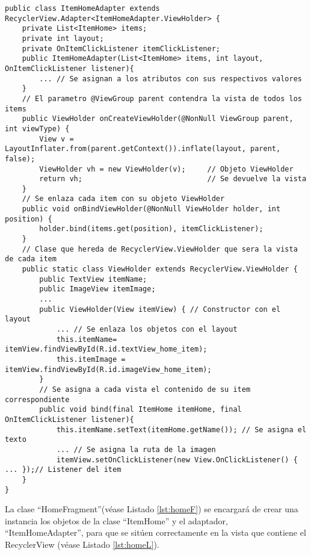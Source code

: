     


\bigskip

\begin{lstlisting}[caption={Fichero \texttt{ItemHomeAdapter.java}, clase que construye las vistas de los ítems.},  label={lst:adapterItem}]
public class ItemHomeAdapter extends RecyclerView.Adapter<ItemHomeAdapter.ViewHolder> {
    private List<ItemHome> items;
    private int layout;
    private OnItemClickListener itemClickListener;
    public ItemHomeAdapter(List<ItemHome> items, int layout, OnItemClickListener listener){
        ... // Se asignan a los atributos con sus respectivos valores
    }
    // El parametro @ViewGroup parent contendra la vista de todos los items
    public ViewHolder onCreateViewHolder(@NonNull ViewGroup parent, int viewType) {
        View v = LayoutInflater.from(parent.getContext()).inflate(layout, parent, false);
        ViewHolder vh = new ViewHolder(v);     // Objeto ViewHolder  
        return vh;                             // Se devuelve la vista    
    }
    // Se enlaza cada item con su objeto ViewHolder
    public void onBindViewHolder(@NonNull ViewHolder holder, int position) {
        holder.bind(items.get(position), itemClickListener);
    }
    // Clase que hereda de RecyclerView.ViewHolder que sera la vista de cada item
    public static class ViewHolder extends RecyclerView.ViewHolder { 
        public TextView itemName;     
        public ImageView itemImage;   
        ...
        public ViewHolder(View itemView) { // Constructor con el layout
            ... // Se enlaza los objetos con el layout
            this.itemName= itemView.findViewById(R.id.textView_home_item);     
            this.itemImage = itemView.findViewById(R.id.imageView_home_item);
        }
        // Se asigna a cada vista el contenido de su item correspondiente 
        public void bind(final ItemHome itemHome, final OnItemClickListener listener){
            this.itemName.setText(itemHome.getName()); // Se asigna el texto
            ... // Se asigna la ruta de la imagen
            itemView.setOnClickListener(new View.OnClickListener() { ... });// Listener del item
    }
}
\end{lstlisting}

La clase ``HomeFragment''(véase Listado \ref{lst:homeF}) se encargará de crear una instancia los objetos de la clase ``ItemHome'' y el adaptador, ``ItemHomeAdapter'', para que se sitúen correctamente en la vista que contiene el RecyclerView (véase Listado \ref{lst:homeL}). 

